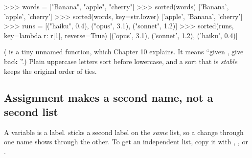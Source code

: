\begin{pycode}
>>> words = ["Banana", "apple", "cherry"]
>>> sorted(words)
['Banana', 'apple', 'cherry']
>>> sorted(words, key=str.lower)
['apple', 'Banana', 'cherry']
>>> runs = [("haiku", 0.4), ("opus", 3.1), ("sonnet", 1.2)]
>>> sorted(runs, key=lambda r: r[1], reverse=True)
[('opus', 3.1), ('sonnet', 1.2), ('haiku', 0.4)]
\end{pycode}

( is a tiny unnamed function, which Chapter 10 explains. It means ``given ,
give back ''.) Plain uppercase letters sort before lowercase, and a sort that is
\emph{stable} keeps the original order of ties.

\subsection{Assignment makes a second name, not a second list}

A variable is a label.  sticks a second label on the \emph{same} list, so a change through one
name shows through the other. To get an independent list, copy it with , , or
.

%
%
\begin{center}
\end{center}

